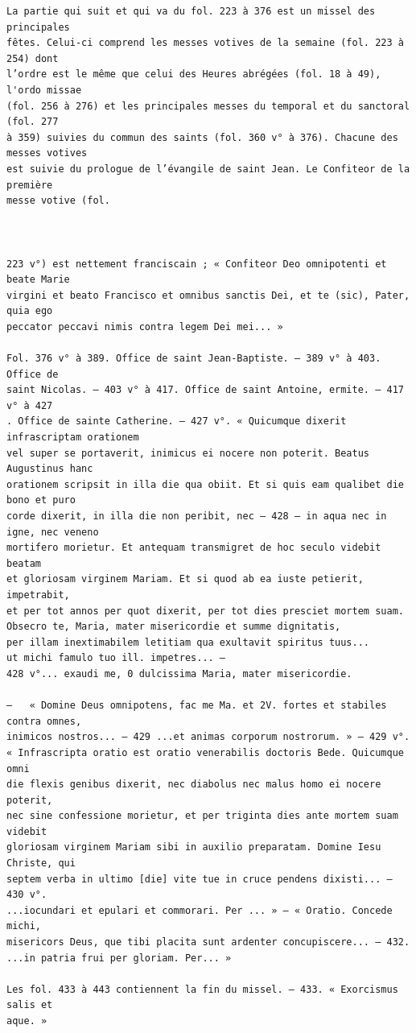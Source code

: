 \documentclass[a4paper,12pt,twoside]{book}
\begin{document}
\begin{verbatim}
La partie qui suit et qui va du fol. 223 à 376 est un missel des principales 
fêtes. Celui-ci comprend les messes votives de la semaine (fol. 223 à 254) dont 
l’ordre est le même que celui des Heures abrégées (fol. 18 à 49), l'ordo missae
(fol. 256 à 276) et les principales messes du temporal et du sanctoral (fol. 277
à 359) suivies du commun des saints (fol. 360 v° à 376). Chacune des messes votives
est suivie du prologue de l’évangile de saint Jean. Le Confiteor de la première
messe votive (fol.



223 v°) est nettement franciscain ; « Confiteor Deo omnipotenti et beate Marie
virgini et beato Francisco et omnibus sanctis Dei, et te (sic), Pater, quia ego
peccator peccavi nimis contra legem Dei mei... »

Fol. 376 v° à 389. Office de saint Jean-Baptiste. — 389 v° à 403. Office de
saint Nicolas. — 403 v° à 417. Office de saint Antoine, ermite. — 417 v° à 427
. Office de sainte Catherine. — 427 v°. « Quicumque dixerit infrascriptam orationem
vel super se portaverit, inimicus ei nocere non poterit. Beatus Augustinus hanc 
orationem scripsit in illa die qua obiit. Et si quis eam qualibet die bono et puro
corde dixerit, in illa die non peribit, nec — 428 — in aqua nec in igne, nec veneno
mortifero morietur. Et antequam transmigret de hoc seculo videbit beatam 
et gloriosam virginem Mariam. Et si quod ab ea iuste petierit, impetrabit, 
et per tot annos per quot dixerit, per tot dies presciet mortem suam. 
Obsecro te, Maria, mater misericordie et summe dignitatis, 
per illam inextimabilem letitiam qua exultavit spiritus tuus... 
ut michi famulo tuo ill. impetres... —
428 v°... exaudi me, 0 dulcissima Maria, mater misericordie.

—	« Domine Deus omnipotens, fac me Ma. et 2V. fortes et stabiles contra omnes, 
inimicos nostros... — 429 ...et animas corporum nostrorum. » — 429 v°.
« Infrascripta oratio est oratio venerabilis doctoris Bede. Quicumque omni
die flexis genibus dixerit, nec diabolus nec malus homo ei nocere poterit, 
nec sine confessione morietur, et per triginta dies ante mortem suam videbit 
gloriosam virginem Mariam sibi in auxilio preparatam. Domine Iesu Christe, qui
septem verba in ultimo [die] vite tue in cruce pendens dixisti... — 430 v°. 
...iocundari et epulari et commorari. Per ... » — « Oratio. Concede michi, 
misericors Deus, que tibi placita sunt ardenter concupiscere... — 432. 
...in patria frui per gloriam. Per... »

Les fol. 433 à 443 contiennent la fin du missel. — 433. « Exorcismus salis et 
aque. »


\end{verbatim}
\end{document}
